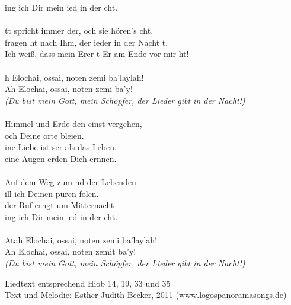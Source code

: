 \begin{tabbing}
ing ich Dir mein ied in der cht.\\
\\
tt spricht immer der, och sie hören's cht.\\
 fragen ht nach Ihm, der ieder in der Nacht t.\\
Ich weiß, dass mein Erer t  Er am Ende vor mir ht!\\
\\
h Elochai, ossai, noten zemi ba'laylah!\\
Ah Elochai, ossai, noten zemi ba'y!\\
\> \textit{(Du bist mein Gott, mein Schöpfer, der Lieder gibt in der Nacht!)}\\
\\
Himmel und Erde den einst vergehen,\\
och Deine orte bleien.\\
ine Liebe ist ser als das Leben.\\
eine Augen erden Dich ernnen.\\
\\
Auf dem Weg zum nd der Lebenden\\
ill ich Deinen puren folen.\\
 der Ruf erngt um Mitternacht\\
ing ich Dir mein ied in der cht.\\
\\
Atah Elochai, ossai, noten zemi ba'laylah!\\
Ah Elochai, ossai, noten zemit ba'y!\\
\> \textit{(Du bist mein Gott, mein Schöpfer, der Lieder gibt in der Nacht!)}\\
\end{tabbing}
\begin{footnotesize}
Liedtext entsprechend Hiob 14, 19, 33 und 35\\
Text und Melodie: Esther Judith Becker, 2011 (www.logospanoramasongs.de)
\end{footnotesize}